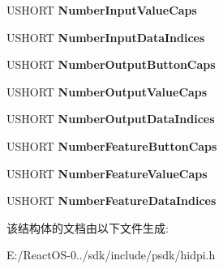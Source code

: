 \begin{DoxyCompactItemize}
\item 
\mbox{\label{struct___h_i_d_p___c_a_p_s_a4309c7a46fb4e34cd72509c3bcf9599b}} 
U\+S\+H\+O\+RT {\bfseries Number\+Input\+Value\+Caps}
\item 
\mbox{\label{struct___h_i_d_p___c_a_p_s_abc8ad8dcf271d6723148ef69c305907b}} 
U\+S\+H\+O\+RT {\bfseries Number\+Input\+Data\+Indices}
\item 
\mbox{\label{struct___h_i_d_p___c_a_p_s_a02d8edfe4a8fda7234f19a9ff5306c44}} 
U\+S\+H\+O\+RT {\bfseries Number\+Output\+Button\+Caps}
\item 
\mbox{\label{struct___h_i_d_p___c_a_p_s_a5e5d8b84fdb17ca0360f3cc45e5e096b}} 
U\+S\+H\+O\+RT {\bfseries Number\+Output\+Value\+Caps}
\item 
\mbox{\label{struct___h_i_d_p___c_a_p_s_ae9a85d7590cb792db5e3f8d83fdc5ad3}} 
U\+S\+H\+O\+RT {\bfseries Number\+Output\+Data\+Indices}
\item 
\mbox{\label{struct___h_i_d_p___c_a_p_s_a09422c11f0e25d344b2356005a8abaf0}} 
U\+S\+H\+O\+RT {\bfseries Number\+Feature\+Button\+Caps}
\item 
\mbox{\label{struct___h_i_d_p___c_a_p_s_ae3945b38ec5524f7b5a8280b18381281}} 
U\+S\+H\+O\+RT {\bfseries Number\+Feature\+Value\+Caps}
\item 
\mbox{\label{struct___h_i_d_p___c_a_p_s_aafbf72dd5f5db6bfc45ae909b66a27c7}} 
U\+S\+H\+O\+RT {\bfseries Number\+Feature\+Data\+Indices}
\end{DoxyCompactItemize}


该结构体的文档由以下文件生成\+:\begin{DoxyCompactItemize}
\item 
E\+:/\+React\+O\+S-\/0../sdk/include/psdk/hidpi.\+h\end{DoxyCompactItemize}
